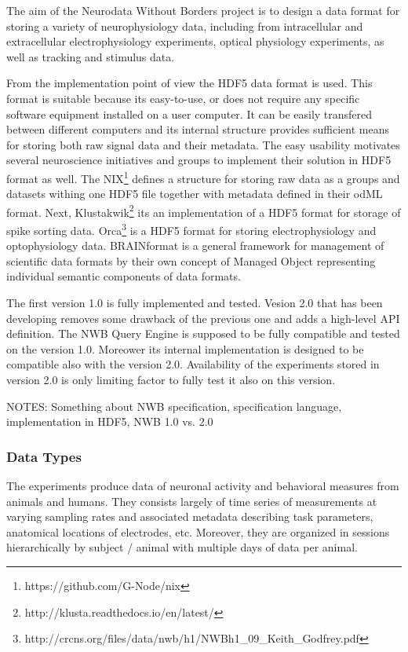 \documentclass[utf8]{frontiersSCNS} %
\begin{document}
The aim of the Neurodata Without Borders project is to design a data format for storing a variety of neurophysiology data, including from intracellular and extracellular electrophysiology experiments, optical physiology experiments, as well as tracking and stimulus data.

From the implementation point of view the HDF5 data format is used. This format is suitable because its easy-to-use, or does not require any specific software equipment installed on a user computer. It can be easily transfered between different computers and its internal structure provides sufficient means for storing both raw signal data and their metadata. The easy usability motivates several neuroscience initiatives and groups to implement their solution in HDF5 format as well. The NIX\footnote{https://github.com/G-Node/nix} defines a structure for storing raw data as a groups and datasets withing one HDF5 file together with metadata defined in their odML \citep{10.3389/fninf.2011.00016} format. Next,  Klustakwik\footnote{http://klusta.readthedocs.io/en/latest/} its an implementation of a HDF5 format for storage of spike sorting data. Orca\footnote{http://crcns.org/files/data/nwb/h1/NWBh1\_09\_Keith\_Godfrey.pdf} is a HDF5 format for storing electrophysiology and optophysiology data. BRAINformat \citep{10.3389/fninf.2016.00048} is a general framework for management of scientific data formats by their own concept of Managed Object representing individual semantic components of data formats.  


The first version 1.0 is fully implemented and tested. Vesion 2.0 that has been developing removes some drawback of the previous one and adds a high-level API definition. The NWB Query Engine is supposed to be fully compatible and tested on the version 1.0. Moreower its internal implementation is designed to be compatible also with the version 2.0. Availability of the experiments stored in version 2.0 is only limiting factor to fully test it also on this version.

NOTES: Something about NWB specification, specification language, implementation in HDF5, NWB 1.0 vs. 2.0


\subsubsection{Data Types}
\label{data-types}

The experiments produce data of neuronal activity and behavioral measures from animals and humans. They consists largely of time series of measurements at varying sampling rates and associated metadata describing task parameters, anatomical locations of electrodes, etc. Moreover, they are organized in sessions hierarchically by subject / animal with multiple days of data per animal.
\end{document}
